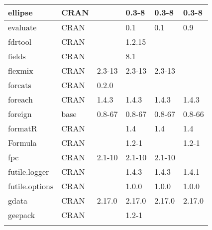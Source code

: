 \begin{longtable}{|llllll|}
ellipse                       & CRAN                      &             & 0.3-8       & 0.3-8          & 0.3-8             \\ \hline \rowcolor{gray!25}
evaluate                      & CRAN                      &             & 0.1         & 0.1            & 0.9              \\ \hline
fdrtool                       & CRAN                      &             & 1.2.15      &                &                   \\ \hline \rowcolor{gray!25}
fields                        & CRAN                      &             & 8.1         &                &                  \\ \hline
flexmix                       & CRAN                      & 2.3-13      & 2.3-13      & 2.3-13         &                   \\ \hline \rowcolor{gray!25}
forcats                       & CRAN                      & 0.2.0       &             &                &                  \\ \hline
foreach                       & CRAN                      & 1.4.3       & 1.4.3       & 1.4.3          & 1.4.3             \\ \hline \rowcolor{gray!25}
foreign                       & base                      & 0.8-67      & 0.8-67      & 0.8-67         & 0.8-66           \\ \hline
formatR                       & CRAN                      &             & 1.4         & 1.4            & 1.4               \\ \hline \rowcolor{gray!25}
Formula                       & CRAN                      &             & 1.2-1       &                & 1.2-1            \\ \hline
fpc                           & CRAN                      & 2.1-10      & 2.1-10      & 2.1-10         &                   \\ \hline \rowcolor{gray!25}
futile.logger                 & CRAN                      &             & 1.4.3       & 1.4.3          & 1.4.1            \\ \hline
futile.options                & CRAN                      &             & 1.0.0       & 1.0.0          & 1.0.0             \\ \hline \rowcolor{gray!25}
gdata                         & CRAN                      & 2.17.0      & 2.17.0      & 2.17.0         & 2.17.0           \\ \hline
geepack                       & CRAN                      &             & 1.2-1       &                &                   \\ \hline \rowcolor{gray!25}

\end{longtable}
